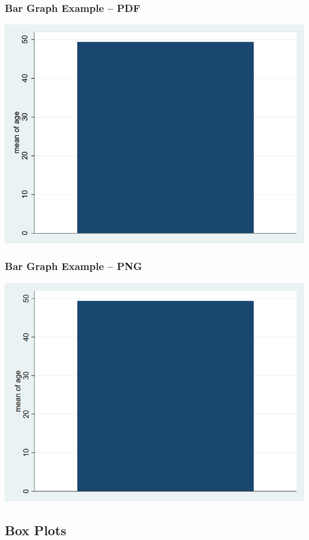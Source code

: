 \documentclass{beamer}
\begin{document}
\begin{frame}
	\frametitle{Bar Graph Example -- PDF}
		\includegraphics[scale=0.7]{DVgraph01.pdf}
\end{frame}

\begin{frame}
	\frametitle{Bar Graph Example -- PNG}
		\includegraphics[scale=0.3]{DVgraph01.png}
\end{frame}

\subsection{Box Plots}
\end{document}
